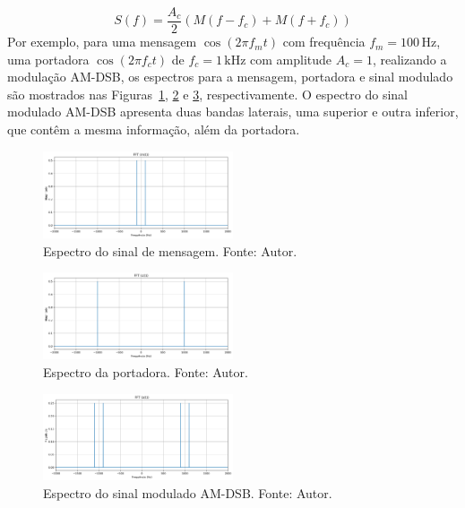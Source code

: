 \begin{equation}
    S(f) = \frac{A_{c}}{2} (M(f - f_{c}) + M(f + f_{c}))
\end{equation}
Por exemplo, para uma mensagem $\cos(2\pi f_{m} t)$ com frequência $f_{m} = 100\,\text{Hz}$, uma portadora $\cos(2\pi f_{c} t)$ de $f_{c} = 1\,\text{kHz}$ com amplitude $A_{c} = 1$, realizando a modulação AM-DSB, os espectros para a mensagem, portadora e sinal modulado são mostrados nas Figuras~\ref{fig:espectro_mensagem}, \ref{fig:espectro_portadora} e \ref{fig:espectro_modulado}, respectivamente. O espectro do sinal modulado AM-DSB apresenta duas bandas laterais, uma superior e outra inferior, que contêm a mesma informação, além da portadora.

\begin{figure}[h]
    \centering
    \includegraphics[width=0.5\textwidth]{images/FFT (m(t))_full.png}
    \caption{Espectro do sinal de mensagem. Fonte: Autor.}
    \label{fig:espectro_mensagem}
    \centering
\end{figure}

\begin{figure}[h]
    \centering
    \includegraphics[width=0.5\textwidth]{images/FFT (c(t))_full.png}
    \caption{Espectro da portadora. Fonte: Autor.}
    \label{fig:espectro_portadora}
    \centering
\end{figure}

\begin{figure}[h]
    \centering
    \includegraphics[width=0.5\textwidth]{images/FFT (s(t))_full.png}
    \caption{Espectro do sinal modulado AM-DSB. Fonte: Autor.}
    \label{fig:espectro_modulado}
    \centering
\end{figure}


